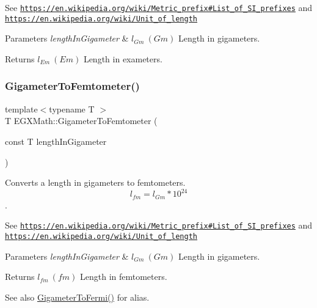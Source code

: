 See \href{https://en.wikipedia.org/wiki/Metric_prefix#List_of_SI_prefixes}{\tt https\+://en.\+wikipedia.\+org/wiki/\+Metric\+\_\+prefix\#\+List\+\_\+of\+\_\+\+S\+I\+\_\+prefixes} and \href{https://en.wikipedia.org/wiki/Unit_of_length}{\tt https\+://en.\+wikipedia.\+org/wiki/\+Unit\+\_\+of\+\_\+length} 
\begin{DoxyParams}{Parameters}
{\em length\+In\+Gigameter} & $ l_{Gm}\ (Gm)$ Length in gigameters. \\
\hline
\end{DoxyParams}
\begin{DoxyReturn}{Returns}
$ l_{Em}\ (Em)$ Length in exameters. 
\end{DoxyReturn}
\mbox{\label{group___e_g_x_math-_conversions-_length_conversions-_gigameter-_s_i_ga6701fe7aa809ca67fef5d4f9bf7b241c}} 
\subsubsection{\texorpdfstring{Gigameter\+To\+Femtometer()}{GigameterToFemtometer()}}
{\footnotesize\ttfamily template$<$typename T $>$ \\
T E\+G\+X\+Math\+::\+Gigameter\+To\+Femtometer (\begin{DoxyParamCaption}\item[{const T}]{length\+In\+Gigameter }\end{DoxyParamCaption})}



Converts a length in gigameters to femtometers. \[ l_{fm}=l_{Gm} * 10^{24} \]. 

See \href{https://en.wikipedia.org/wiki/Metric_prefix#List_of_SI_prefixes}{\tt https\+://en.\+wikipedia.\+org/wiki/\+Metric\+\_\+prefix\#\+List\+\_\+of\+\_\+\+S\+I\+\_\+prefixes} and \href{https://en.wikipedia.org/wiki/Unit_of_length}{\tt https\+://en.\+wikipedia.\+org/wiki/\+Unit\+\_\+of\+\_\+length} 
\begin{DoxyParams}{Parameters}
{\em length\+In\+Gigameter} & $ l_{Gm}\ (Gm)$ Length in gigameters. \\
\hline
\end{DoxyParams}
\begin{DoxyReturn}{Returns}
$ l_{fm}\ (fm)$ Length in femtometers. 
\end{DoxyReturn}
\begin{DoxySeeAlso}{See also}
\mbox{\hyperlink{group___e_g_x_math-_conversions-_length_conversions-_gigameter-_non-_s_i_gadf6d730ad6e47bc8be214f3ef59b48ca}{Gigameter\+To\+Fermi()}} for alias. 
\end{DoxySeeAlso}
\mbox{\label{group___e_g_x_math-_conversions-_length_conversions-_gigameter-_s_i_ga25121199c511ed43c20fa9c9bdefc0ca}} 
